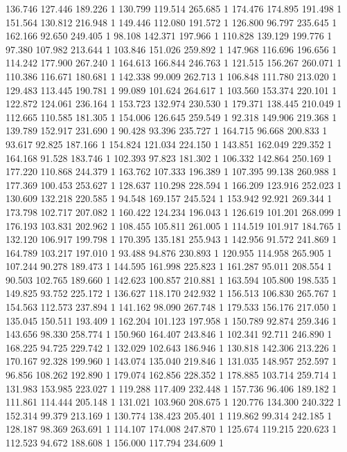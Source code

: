 	136.746	127.446	189.226	1
	130.799	119.514	265.685	1
	174.476	174.895	191.498	1
	151.564	130.812	216.948	1
	149.446	112.080	191.572	1
	126.800	96.797	235.645	1
	162.166	92.650	249.405	1
	98.108	142.371	197.966	1
	110.828	139.129	199.776	1
	97.380	107.982	213.644	1
	103.846	151.026	259.892	1
	147.968	116.696	196.656	1
	114.242	177.900	267.240	1
	164.613	166.844	246.763	1
	121.515	156.267	260.071	1
	110.386	116.671	180.681	1
	142.338	99.009	262.713	1
	106.848	111.780	213.020	1
	129.483	113.445	190.781	1
	99.089	101.624	264.617	1
	103.560	153.374	220.101	1
	122.872	124.061	236.164	1
	153.723	132.974	230.530	1
	179.371	138.445	210.049	1
	112.665	110.585	181.305	1
	154.006	126.645	259.549	1
	92.318	149.906	219.368	1
	139.789	152.917	231.690	1
	90.428	93.396	235.727	1
	164.715	96.668	200.833	1
	93.617	92.825	187.166	1
	154.824	121.034	224.150	1
	143.851	162.049	229.352	1
	164.168	91.528	183.746	1
	102.393	97.823	181.302	1
	106.332	142.864	250.169	1
	177.220	110.868	244.379	1
	163.762	107.333	196.389	1
	107.395	99.138	260.988	1
	177.369	100.453	253.627	1
	128.637	110.298	228.594	1
	166.209	123.916	252.023	1
	130.609	132.218	220.585	1
	94.548	169.157	245.524	1
	153.942	92.921	269.344	1
	173.798	102.717	207.082	1
	160.422	124.234	196.043	1
	126.619	101.201	268.099	1
	176.193	103.831	202.962	1
	108.455	105.811	261.005	1
	114.519	101.917	184.765	1
	132.120	106.917	199.798	1
	170.395	135.181	255.943	1
	142.956	91.572	241.869	1
	164.789	103.217	197.010	1
	93.488	94.876	230.893	1
	120.955	114.958	265.905	1
	107.244	90.278	189.473	1
	144.595	161.998	225.823	1
	161.287	95.011	208.554	1
	90.503	102.765	189.660	1
	142.623	100.857	210.881	1
	163.594	105.800	198.535	1
	149.825	93.752	225.172	1
	136.627	118.170	242.932	1
	156.513	106.830	265.767	1
	154.563	112.573	237.894	1
	141.162	98.090	267.748	1
	179.533	156.176	217.050	1
	135.045	150.511	193.409	1
	162.204	101.123	197.958	1
	150.789	92.874	259.346	1
	143.656	98.330	258.774	1
	150.960	164.407	243.846	1
	102.341	92.711	246.890	1
	168.225	94.725	229.742	1
	132.029	102.643	186.946	1
	130.818	142.306	213.226	1
	170.167	92.328	199.960	1
	143.074	135.040	219.846	1
	131.035	148.957	252.597	1
	96.856	108.262	192.890	1
	179.074	162.856	228.352	1
	178.885	103.714	259.714	1
	131.983	153.985	223.027	1
	119.288	117.409	232.448	1
	157.736	96.406	189.182	1
	111.861	114.444	205.148	1
	131.021	103.960	208.675	1
	120.776	134.300	240.322	1
	152.314	99.379	213.169	1
	130.774	138.423	205.401	1
	119.862	99.314	242.185	1
	128.187	98.369	263.691	1
	114.107	174.008	247.870	1
	125.674	119.215	220.623	1
	112.523	94.672	188.608	1
	156.000	117.794	234.609	1
